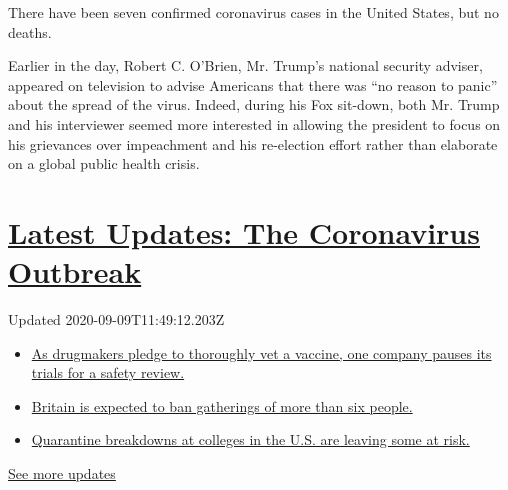 There have been seven confirmed coronavirus cases in the United States,
but no deaths.

Earlier in the day, Robert C. O'Brien, Mr. Trump's national security
adviser, appeared on television to advise Americans that there was ``no
reason to panic'' about the spread of the virus. Indeed, during his Fox
sit-down, both Mr. Trump and his interviewer seemed more interested in
allowing the president to focus on his grievances over impeachment and
his re-election effort rather than elaborate on a global public health
crisis.

\hypertarget{latest-updates-the-coronavirus-outbreak}{%
\section{\texorpdfstring{\href{https://www.nytimes3xbfgragh.onion/2020/09/09/world/covid-19-coronavirus.html?action=click\&pgtype=Article\&state=default\&region=MAIN_CONTENT_1\&context=storylines_live_updates}{Latest
Updates: The Coronavirus
Outbreak}}{Latest Updates: The Coronavirus Outbreak}}\label{latest-updates-the-coronavirus-outbreak}}

Updated 2020-09-09T11:49:12.203Z

\begin{itemize}
\tightlist
\item
  \href{https://www.nytimes3xbfgragh.onion/2020/09/09/world/covid-19-coronavirus.html?action=click\&pgtype=Article\&state=default\&region=MAIN_CONTENT_1\&context=storylines_live_updates\#link-70cea8bb}{As
  drugmakers pledge to thoroughly vet a vaccine, one company pauses its
  trials for a safety review.}
\item
  \href{https://www.nytimes3xbfgragh.onion/2020/09/09/world/covid-19-coronavirus.html?action=click\&pgtype=Article\&state=default\&region=MAIN_CONTENT_1\&context=storylines_live_updates\#link-780eaa2f}{Britain
  is expected to ban gatherings of more than six people.}
\item
  \href{https://www.nytimes3xbfgragh.onion/2020/09/09/world/covid-19-coronavirus.html?action=click\&pgtype=Article\&state=default\&region=MAIN_CONTENT_1\&context=storylines_live_updates\#link-11cec4c0}{Quarantine
  breakdowns at colleges in the U.S. are leaving some at risk.}
\end{itemize}

\href{https://www.nytimes3xbfgragh.onion/2020/09/09/world/covid-19-coronavirus.html?action=click\&pgtype=Article\&state=default\&region=MAIN_CONTENT_1\&context=storylines_live_updates}{See
more updates}

